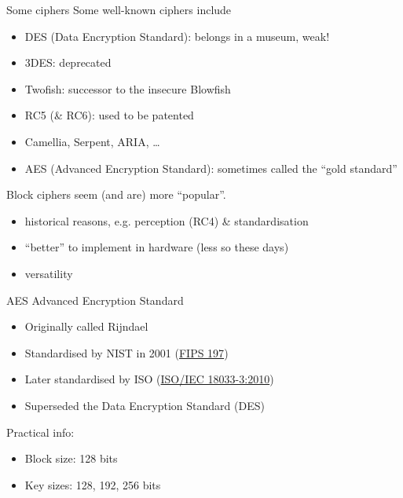 \begin{frame}{Some ciphers}
  Some well-known ciphers include
  \pause
  \begin{itemize}[<+->]
    \item DES (Data Encryption Standard): belongs in a museum, weak!
    \item 3DES: deprecated
    \item Twofish: successor to the insecure Blowfish
    \item RC5 (\& RC6): used to be patented
    \item Camellia, Serpent, ARIA, \dots
    \item AES (Advanced Encryption Standard): sometimes called the \enquote{gold standard}
  \end{itemize}

  \vspace*{1em}

  \pause
  Block ciphers seem (and are) more \enquote{popular}.
  \begin{itemize}[<+(1)->]
    \item historical reasons, e.g. perception (RC4) \& standardisation
    \item \enquote{better} to implement in hardware (less so these days)
    \item versatility
  \end{itemize}
\end{frame}

\begin{frame}{AES}
  Advanced Encryption Standard
  \begin{itemize}[<+(1)->]
    \item Originally called Rijndael
    \item Standardised by NIST in 2001 (\href{https://csrc.nist.gov/pubs/fips/197/final}{FIPS 197})
    \item Later standardised by ISO (\href{https://www.iso.org/standard/54531.html}{ISO/IEC 18033-3:2010})
    \item Superseded the Data Encryption Standard (DES)
  \end{itemize}

  \pause
  Practical info:
  \begin{itemize}[<+->]
    \item Block size: 128 bits
    \item Key sizes: 128, 192, 256 bits
  \end{itemize}
\end{frame}

